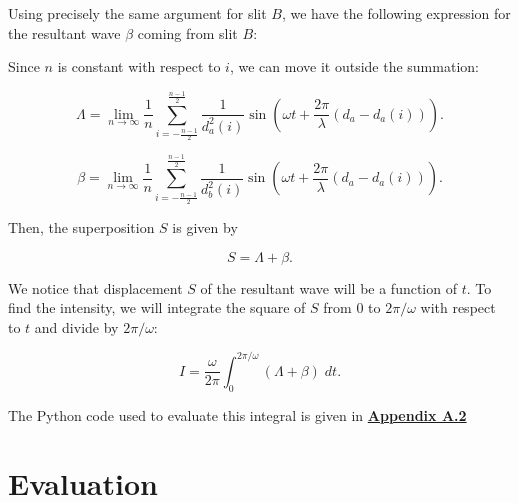 \documentclass{paper}
\begin{document}
Using precisely the same argument for slit $B$, we have the following expression for the resultant wave $\beta$ coming from slit $B$:

Since $n$ is constant with respect to $i$, we can move it outside the summation:

\begin{equation*}
        \Lambda = \lim_{n \to \infty} \frac{1}{n}\sum_{i = -\frac{n - 1}{2}}^{\frac{n - 1}{2}} \frac{1}{ d_a^2(i)} \sin\left(\omega t + \frac{2\pi}{\lambda}(d_a - d_a(i))\right).
\end{equation*}

\begin{equation*}
    \beta = \lim_{n \to \infty} \frac{1}{n}\sum_{i = -\frac{n - 1}{2}}^{\frac{n - 1}{2}} \frac{1}{d_b^2(i)} \sin\left(\omega t + \frac{2\pi}{\lambda}(d_a - d_a(i))\right).
\end{equation*}

Then, the superposition $S$ is given by

\begin{equation*}
    S = \Lambda + \beta.
\end{equation*}

We notice that displacement $S$ of the resultant wave will be a function of $t$. To find the intensity, we will integrate the square of $S$ from $0$ to $2\pi / \omega$ with respect to $t$ and divide by $2\pi / \omega$:

\begin{equation*}
    I = \frac{\omega}{2\pi}\int_{0}^{2\pi / \omega} (\Lambda + \beta) \; dt.
\end{equation*}

The Python code used to evaluate this integral is given in \textbf{\hyperref[appendix:diffraction-code]{Appendix A.2}}
\section{Evaluation}
\end{document}
